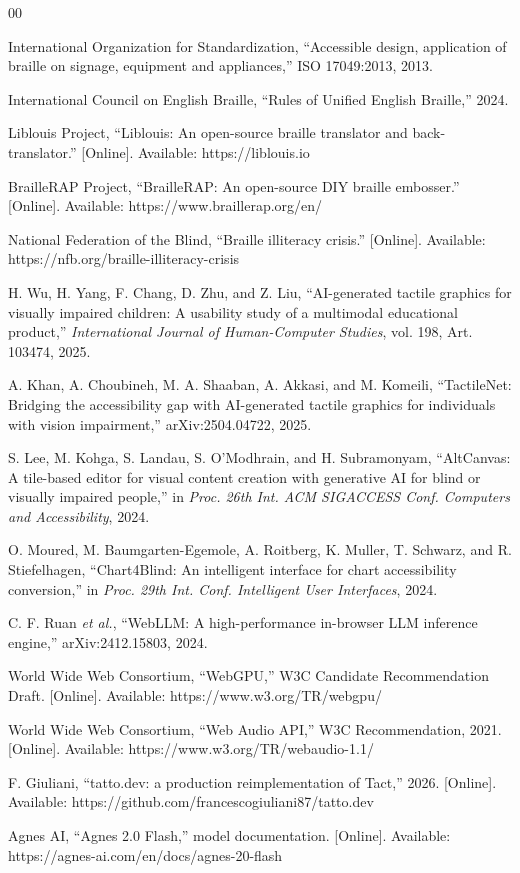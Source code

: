 \documentclass[conference]{IEEEtran}
\begin{document}
\begin{thebibliography}{00}

 International Organization for Standardization, ``Accessible design, application of braille on signage, equipment and appliances,'' ISO 17049:2013, 2013.

 International Council on English Braille, ``Rules of Unified English Braille,'' 2024.

 Liblouis Project, ``Liblouis: An open-source braille translator and back-translator.'' [Online]. Available: https://liblouis.io

 BrailleRAP Project, ``BrailleRAP: An open-source DIY braille embosser.'' [Online]. Available: https://www.braillerap.org/en/

 National Federation of the Blind, ``Braille illiteracy crisis.'' [Online]. Available: https://nfb.org/braille-illiteracy-crisis

 H. Wu, H. Yang, F. Chang, D. Zhu, and Z. Liu, ``AI-generated tactile graphics for visually impaired children: A usability study of a multimodal educational product,'' \emph{International Journal of Human-Computer Studies}, vol. 198, Art. 103474, 2025.

 A. Khan, A. Choubineh, M. A. Shaaban, A. Akkasi, and M. Komeili, ``TactileNet: Bridging the accessibility gap with AI-generated tactile graphics for individuals with vision impairment,'' arXiv:2504.04722, 2025.

 S. Lee, M. Kohga, S. Landau, S. O'Modhrain, and H. Subramonyam, ``AltCanvas: A tile-based editor for visual content creation with generative AI for blind or visually impaired people,'' in \emph{Proc. 26th Int. ACM SIGACCESS Conf. Computers and Accessibility}, 2024.

 O. Moured, M. Baumgarten-Egemole, A. Roitberg, K. Muller, T. Schwarz, and R. Stiefelhagen, ``Chart4Blind: An intelligent interface for chart accessibility conversion,'' in \emph{Proc. 29th Int. Conf. Intelligent User Interfaces}, 2024.

 C. F. Ruan \emph{et al.}, ``WebLLM: A high-performance in-browser LLM inference engine,'' arXiv:2412.15803, 2024.

 World Wide Web Consortium, ``WebGPU,'' W3C Candidate Recommendation Draft. [Online]. Available: https://www.w3.org/TR/webgpu/

 World Wide Web Consortium, ``Web Audio API,'' W3C Recommendation, 2021. [Online]. Available: https://www.w3.org/TR/webaudio-1.1/

 F. Giuliani, ``tatto.dev: a production reimplementation of Tact,'' 2026. [Online]. Available: https://github.com/francescogiuliani87/tatto.dev

 Agnes AI, ``Agnes 2.0 Flash,'' model documentation. [Online]. Available: https://agnes-ai.com/en/docs/agnes-20-flash

\end{thebibliography}
\end{document}
